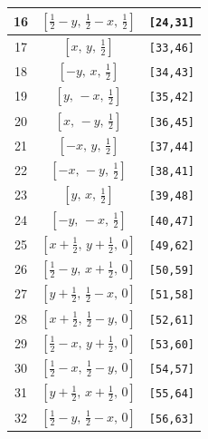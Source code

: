 \documentclass[fleqn,8pt]{jsarticle}
\begin{document}
\begin{longtable}{ccc}
16 & $\left[ \frac{1}{2} - y,\, \frac{1}{2} - x,\, \frac{1}{2} \right]$ & {\tt [24,31]} \\ \hline
17 & $\left[ x,\, y,\, \frac{1}{2} \right]$ & {\tt [33,46]} \\ \hline
18 & $\left[ - y,\, x,\, \frac{1}{2} \right]$ & {\tt [34,43]} \\ \hline
19 & $\left[ y,\, - x,\, \frac{1}{2} \right]$ & {\tt [35,42]} \\ \hline
20 & $\left[ x,\, - y,\, \frac{1}{2} \right]$ & {\tt [36,45]} \\ \hline
21 & $\left[ - x,\, y,\, \frac{1}{2} \right]$ & {\tt [37,44]} \\ \hline
22 & $\left[ - x,\, - y,\, \frac{1}{2} \right]$ & {\tt [38,41]} \\ \hline
23 & $\left[ y,\, x,\, \frac{1}{2} \right]$ & {\tt [39,48]} \\ \hline
24 & $\left[ - y,\, - x,\, \frac{1}{2} \right]$ & {\tt [40,47]} \\ \hline
25 & $\left[ x + \frac{1}{2},\, y + \frac{1}{2},\, 0 \right]$ & {\tt [49,62]} \\ \hline
26 & $\left[ \frac{1}{2} - y,\, x + \frac{1}{2},\, 0 \right]$ & {\tt [50,59]} \\ \hline
27 & $\left[ y + \frac{1}{2},\, \frac{1}{2} - x,\, 0 \right]$ & {\tt [51,58]} \\ \hline
28 & $\left[ x + \frac{1}{2},\, \frac{1}{2} - y,\, 0 \right]$ & {\tt [52,61]} \\ \hline
29 & $\left[ \frac{1}{2} - x,\, y + \frac{1}{2},\, 0 \right]$ & {\tt [53,60]} \\ \hline
30 & $\left[ \frac{1}{2} - x,\, \frac{1}{2} - y,\, 0 \right]$ & {\tt [54,57]} \\ \hline
31 & $\left[ y + \frac{1}{2},\, x + \frac{1}{2},\, 0 \right]$ & {\tt [55,64]} \\ \hline
32 & $\left[ \frac{1}{2} - y,\, \frac{1}{2} - x,\, 0 \right]$ & {\tt [56,63]} \\
\end{longtable}
\renewcommand{\arraystretch}{1.2}
\end{document}
